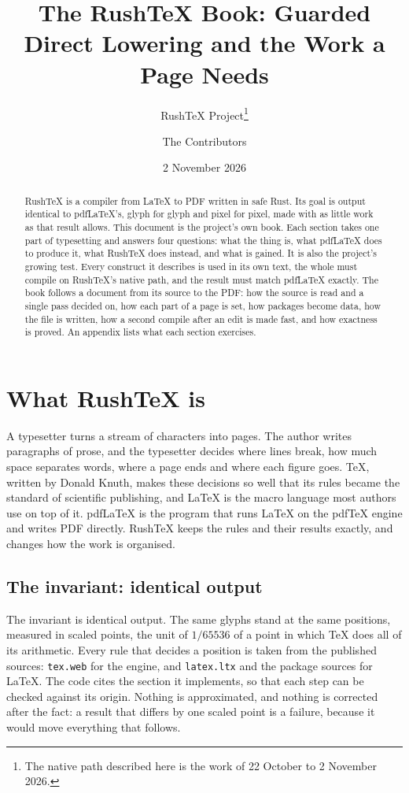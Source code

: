 \documentclass{article}
\title{The RushTeX Book: Guarded Direct Lowering and the Work a Page Needs}
\author{RushTeX Project\thanks{The native path described here is the work of 22 October to 2 November 2026.} \and The Contributors}
\date{2 November 2026}
\numberwithin{equation}{section}
\theoremstyle{definition}
\theoremstyle{remark}
\begin{document}
\maketitle

\begin{abstract}
RushTeX is a compiler from LaTeX to PDF written in safe Rust. Its goal is output
identical to pdfLaTeX's, glyph for glyph and pixel for pixel, made with as little work
as that result allows. This document is the project's own book. Each section takes one
part of typesetting and answers four questions: what the thing is, what pdfLaTeX does to
produce it, what RushTeX does instead, and what is gained. It is also the project's
growing test. Every construct it describes is used in its own text, the whole must
compile on RushTeX's native path, and the result must match pdfLaTeX exactly. The
book follows a document from its source to the PDF: how the source is read and a single
pass decided on, how each part of a page is set, how packages become data, how the file
is written, how a second compile after an edit is made fast, and how exactness is
proved. An appendix lists what each section exercises.
\end{abstract}

\tableofcontents

\listoffigures
\listoftables
\listofalgorithms
{}

\section{What RushTeX is}\label{sec:intro}

A typesetter turns a stream of characters into pages. The author writes paragraphs of
prose, and the typesetter decides where lines break, how much space separates words,
where a page ends and where each figure goes. \TeX, written by Donald Knuth, makes these
decisions so well that its rules became the standard of scientific publishing, and
\LaTeX{} is the macro language most authors use on top of it. pdfLaTeX is the program
that runs \LaTeX{} on the pdfTeX engine and writes PDF directly. RushTeX keeps the rules
and their results exactly, and changes how the work is organised.

\subsection{The invariant: identical output}

The invariant is identical output. The same glyphs stand at the same positions,
measured in scaled points, the unit of $1/65536$ of a point in which \TeX{} does all of
its arithmetic. Every rule that decides a position is taken from the published sources:
\texttt{tex.web} for the engine, and \texttt{latex.ltx} and the package sources for
\LaTeX. The code cites the section it implements, so that each step can be checked
against its origin. Nothing is approximated, and nothing is corrected after the fact: a
result that differs by one scaled point is a failure, because it would move everything
that follows.
\end{document}
